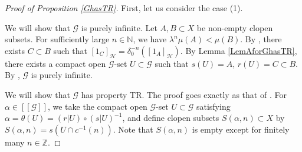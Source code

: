 \documentclass[11pt]{article}
\theoremstyle{definition}
\numberwithin{equation}{section}
\newcommand{\G}{\mathcal{G}}
\renewcommand{\H}{\mathcal{H}}
\newcommand{\N}{\mathbb{N}}
\newcommand{\Z}{\mathbb{Z}}
\begin{document}
\begin{proof}[Proof of Proposition \ref{GhasTR}]
First, let us consider the case (1). 

We will show that $\G$ is purely infinite. 
Let $A,B\subset X$ be non-empty clopen subsets. 
For sufficiently large $n\in\N$, we have $\lambda^n\mu(A)<\mu(B)$. 
By \cite[Lemma 6.7]{M12PLMS}, 
there exists $C\subset B$ such that $[1_C]_\H=\delta_0^{-n}([1_A]_\H)$. 
By Lemma \ref{LemAforGhasTR}, 
there exists a compact open $\G$-set $U\subset\G$ 
such that $s(U)=A$, $r(U)=C\subset B$. 
By \cite[Proposition 4.11]{M15crelle}, $\G$ is purely infinite. 

We will show that $\G$ has property TR. 
The proof goes exactly as that of \cite[Lemma 6.10]{M15crelle}. 
For $\alpha\in[[\G]]$, 
we take the compact open $\G$-set $U\subset\G$ 
satisfying $\alpha=\theta(U)=(r|U)\circ(s|U)^{-1}$, 
and define clopen subsets $S(\alpha,n)\subset X$ by 
$S(\alpha,n)=s(U\cap c^{-1}(n))$. 
Note that $S(\alpha,n)$ is empty except for finitely many $n\in\Z$. 


\end{proof}
\end{document}
